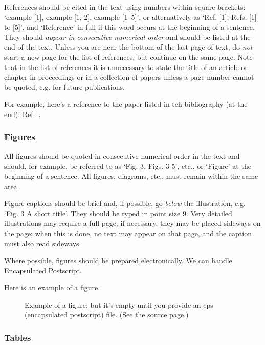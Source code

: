 \documentclass{article}
\begin{document}
References should be cited  in the text using numbers within
square brackets: `example [1],
example [1, 2], example [1--5]', or alternatively as
`Ref. [1], Refs. [1] to [5]', and
`Reference' in full if this word occurs at the
beginning of a sentence.
They should {\it appear in consecutive numerical order}
and should be listed at the end of the text.
Unless you are near the bottom of the last page of text,
do {\it not} start a new page for the list of
references, but continue on the same page.
Note that in the list of references it is
unnecessary to state the title of an article or chapter in
proceedings or in a collection of papers unless a page number
cannot be quoted, e.g. for future publications.

For example, here's a reference to the paper
listed in teh bibliography (at the end):
Ref.\ \cite{Stump}.

\subsubsection{Figures}

All figures should be quoted in consecutive numerical order
in the text and should, for example, be referred to as
`Fig. 3, Figs. 3-5', etc., or `Figure' at the beginning of a
sentence.
All figures, diagrams, etc., must remain within the same area.

Figure captions should be brief and, if possible,
go {\it below} the illustration, e.g. `Fig. 3 A short title'.
They should be typed in point size 9. Very detailed illustrations may
require a full page; if necessary, they may be placed sideways on the
page; when this is done, no text may appear on that page, and the
caption must also read sideways. 

Where possible, figures should be prepared electronically.
We can handle Encapsulated Postscript.

Here is an example of a figure.

\begin{figure}
\label{fig:cc}
\caption{Example of a figure; but it's empty
until you provide an eps (encapsulated postscript)
file. (See the source page.)}
\begin{center}
\end{center}
\end{figure}

\subsubsection{Tables}
\end{document}
